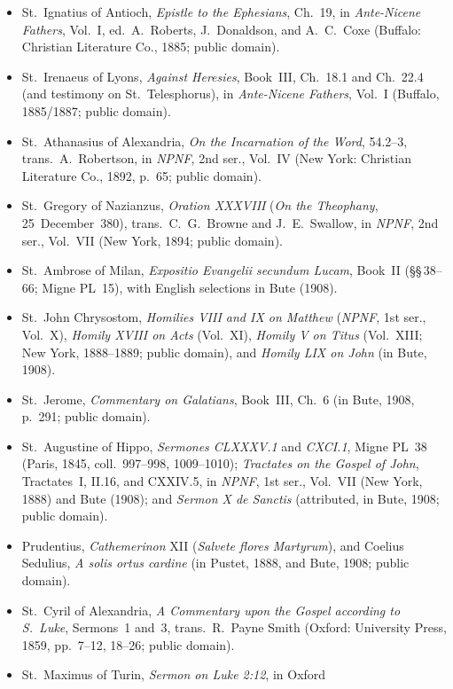 \begin{itemize}
\item St.~Ignatius of Antioch, \textit{Epistle to the Ephesians}, Ch.~19, in
\textit{Ante-Nicene Fathers}, Vol.~I, ed.\ A.~Roberts, J.~Donaldson, and
A.~C.~Coxe (Buffalo: Christian Literature Co., 1885; public domain).
\item St.~Irenaeus of Lyons, \textit{Against Heresies}, Book~III, Ch.~18.1 and
Ch.~22.4 (and testimony on St.~Telesphorus), in \textit{Ante-Nicene Fathers},
Vol.~I (Buffalo, 1885/1887; public domain).
\item St.~Athanasius of Alexandria, \textit{On the Incarnation of the Word},
54.2--3, trans.\ A.~Robertson, in \textit{NPNF}, 2nd ser., Vol.~IV (New York:
Christian Literature Co., 1892, p.~65; public domain).
\item St.~Gregory of Nazianzus, \textit{Oration XXXVIII} (\textit{On the
Theophany}, 25~December~380), trans.\ C.~G.~Browne and J.~E.~Swallow, in
\textit{NPNF}, 2nd ser., Vol.~VII (New York, 1894; public domain).
\item St.~Ambrose of Milan, \textit{Expositio Evangelii secundum Lucam}, Book~II
(\S\S\,38--66; Migne PL~15), with English selections in Bute (1908).
\item St.~John Chrysostom, \textit{Homilies VIII and IX on Matthew}
(\textit{NPNF}, 1st ser., Vol.~X), \textit{Homily XVIII on Acts} (Vol.~XI),
\textit{Homily V on Titus} (Vol.~XIII; New York, 1888--1889; public domain), and
\textit{Homily LIX on John} (in Bute, 1908).
\item St.~Jerome, \textit{Commentary on Galatians}, Book~III, Ch.~6 (in Bute,
1908, p.~291; public domain).
\item St.~Augustine of Hippo, \textit{Sermones CLXXXV.1} and \textit{CXCI.1},
Migne PL~38 (Paris, 1845, coll.~997--998, 1009--1010); \textit{Tractates on the
Gospel of John}, Tractates~I, II.16, and CXXIV.5, in \textit{NPNF}, 1st ser.,
Vol.~VII (New York, 1888) and Bute (1908); and \textit{Sermon X de Sanctis}
(attributed, in Bute, 1908; public domain).
\item Prudentius, \textit{Cathemerinon} XII (\textit{Salvete flores Martyrum}),
and Coelius Sedulius, \textit{A solis ortus cardine} (in Pustet, 1888, and Bute,
1908; public domain).
\item St.~Cyril of Alexandria, \textit{A Commentary upon the Gospel according to
S.~Luke}, Sermons~1 and~3, trans.\ R.~Payne Smith (Oxford: University Press,
1859, pp.~7--12, 18--26; public domain).
\item St.~Maximus of Turin, \textit{Sermon on Luke 2:12}, in Oxford

\end{itemize}
